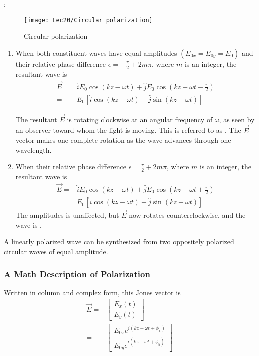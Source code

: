 : 
\begin{figure}[H]
    \centering
    \texttt{[image: Lec20/Circular polarization]}
    \caption{Circular polarization}
\end{figure}
\begin{enumerate}
    \item When both constituent waves have equal amplitudes $(E_{0x}=E_{0y}=E_{0})$ and their relative phase difference $\epsilon=-\frac{\pi}{2}+2m\pi$, where $m$ is an integer, the resultant wave is
    \begin{align*}
        \vec{E}=&\hat{i}E_0\cos(kz-\omega t)+\hat{j}E_0\cos(kz-\omega t-\frac{\pi}{2})\\
        =&E_0\left[ \hat{i}\cos(kz-\omega t)+\hat{j}\sin(kz-\omega t) \right]
    \end{align*}
    
    The resultant $\vec{E}$ is rotating clockwise at an angular frequency of  $\omega$, as seen by an observer toward whom the light is moving. This is referred to as . The $\vec{E}$-vector makes one complete rotation as the wave advances through one wavelength. 
    \item When their relative phase difference $\epsilon=\frac{\pi}{2}+2m\pi$, where $m$ is an integer, the resultant wave is 
    \begin{align*}
        \vec{E}=&\hat{i}E_0\cos(kz-\omega t)+\hat{j}E_0\cos(kz-\omega t+\frac{\pi}{2})\\
        =&E_0\left[ \hat{i}\cos(kz-\omega t)-\hat{j}\sin(kz-\omega t) \right]
    \end{align*}
    The amplitudes is unaffected, but $\vec{E}$ now rotates counterclockwise, and the wave is . 
\end{enumerate}

A linearly polarized wave can be synthesized from two oppositely polarized circular waves of equal amplitude. 

\subsubsection{A Math Description of Polarization}
Written in column and complex form, this Jones vector is 
\begin{align*}
    \vec{E}=&\begin{bmatrix}
        E_x(t)\\E_y(t)
    \end{bmatrix}\\
    =&\begin{bmatrix}
        E_{0x}e^{i(kz-\omega t+\phi_x)}\\
        E_{0y}e^{i(kz-\omega t+\phi_y)}
    \end{bmatrix}
\end{align*}

